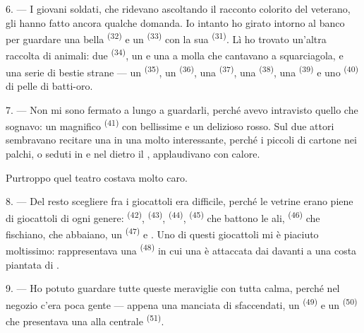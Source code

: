 6. --- I giovani soldati, che ridevano ascoltando il racconto colorito del veterano,
gli hanno fatto ancora qualche domanda. Io intanto ho girato intorno al banco per
guardare una bella  \textsuperscript{(32)} e un 
\textsuperscript{(33)} con la sua  \textsuperscript{(31)}. Lì ho
trovato un'altra raccolta di animali: due 
\textsuperscript{(34)}, un  e una  a molla che
cantavano a squarciagola, e una serie di bestie strane --- un 
\textsuperscript{(35)}, un  \textsuperscript{(36)}, una 
\textsuperscript{(37)}, una  \textsuperscript{(38)}, una
 \textsuperscript{(39)} e uno  \textsuperscript{(40)} di
pelle di batti-oro.

7. --- Non mi sono fermato a lungo a guardarli, perché avevo intravisto quello che
sognavo: un magnifico  \textsuperscript{(41)} con
bellissime  e un delizioso  rosso. Sul  due
attori sembravano recitare una  in una  molto
interessante, perché i piccoli  di cartone nei palchi, o seduti in
 e nel  dietro il ,
applaudivano con calore.

Purtroppo quel teatro costava molto caro.

8. --- Del resto scegliere fra i giocattoli era difficile, perché le vetrine erano piene
di giocattoli di ogni genere:  \textsuperscript{(42)},
 \textsuperscript{(43)},  \textsuperscript{(44)},
 \textsuperscript{(45)} che battono le ali, 
\textsuperscript{(46)} che fischiano,  che abbaiano, un
 \textsuperscript{(47)} e . Uno di questi
giocattoli mi è piaciuto moltissimo: rappresentava una 
\textsuperscript{(48)} in cui una  è attaccata dai  davanti
a una costa piantata di .


9. --- Ho potuto guardare tutte queste meraviglie con tutta calma, perché nel negozio
c'era poca gente --- appena una manciata di sfaccendati, un 
\textsuperscript{(49)} e un  \textsuperscript{(50)} che presentava una
 alla  centrale \textsuperscript{(51)}.

